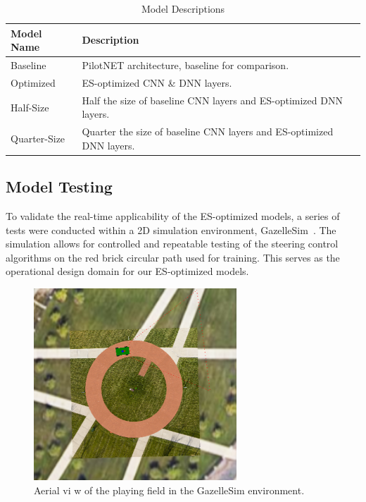 \documentclass[conference]{IEEEtran}
\begin{document}
\begin{table}[ht]
    \centering
    \caption{Model Descriptions}
    \begin{tabular}{p{0.75in}|p{2.25in}}

        \textbf{Model Name} & \textbf{Description}                                                 \\
        \hline
        Baseline            & PilotNET architecture, baseline for comparison.                      \\
        Optimized           & ES-optimized CNN \& DNN layers.                                      \\
        Half-Size           & Half the size of baseline CNN layers and ES-optimized DNN layers.    \\
        Quarter-Size        & Quarter the size of baseline CNN layers and ES-optimized DNN layers. \\
    \end{tabular}
    \label{tab:aliases}
\end{table}

\subsection{Model Testing}

To validate the real-time applicability of the ES-optimized models, a series of tests were conducted within a 2D simulation environment, GazelleSim~\cite{gazelle_sim}. The simulation allows for controlled and repeatable testing of the steering control algorithms on the red brick circular path used for training. This serves as the operational design domain for our ES-optimized models.

\begin{figure}[ht]
    \centering
    \includegraphics[width=3in]{assets/Gazelle-Playing-Field.png}
    \caption{ Aerial vi w of the playing field in the GazelleSim environment.}
    \label{fig:field}
\end{figure}
\end{document}
